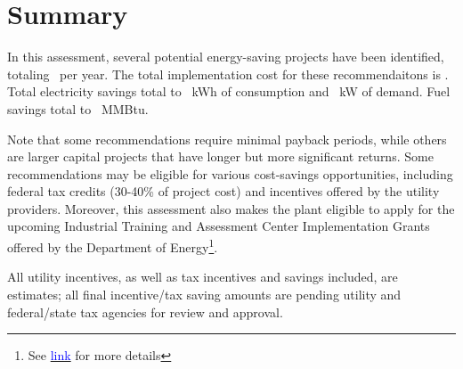 \section{Summary}
In this assessment, several potential energy-saving projects have been identified, totaling \TotalRecSavings~per year. The total implementation cost for these recommendaitons is \TotalRecImplementation. Total electricity savings total to \TotalkWhSavings\ kWh of consumption and \TotalkWSavings\ kW of demand.  Fuel savings total to \TotalGasSavings\ MMBtu. 

Note that some recommendations require minimal payback periods, while others are larger capital projects that have longer but more significant returns. Some recommendations may be eligible for various cost-savings opportunities, including federal tax credits (30-40\% of project cost) and incentives offered by the utility providers. Moreover, this assessment also makes the plant eligible to apply for the upcoming Industrial Training and Assessment Center Implementation Grants offered by the Department of Energy\footnote{See \href{https://www.energywerx.org/itac}{\textcolor{blue}{link}} for more details}.


All utility incentives, as well as tax incentives and savings included, are estimates; all final incentive/tax saving amounts are pending utility and federal/state tax agencies for review and approval.